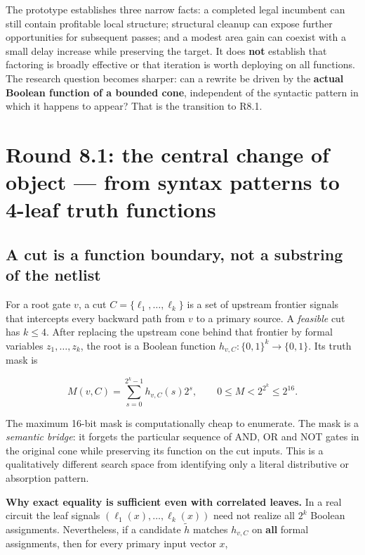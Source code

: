 The prototype establishes three narrow facts: a completed legal incumbent can still contain profitable local structure; structural cleanup can expose further opportunities for subsequent passes; and a modest area gain can coexist with a small delay increase while preserving the target. It does \textbf{not} establish that factoring is broadly effective or that iteration is worth deploying on all functions. The research question becomes sharper: can a rewrite be driven by the \textbf{actual Boolean function of a bounded cone}, independent of the syntactic pattern in which it happens to appear? That is the transition to R8.1.

\section{Round 8.1: the central change of object --- from syntax patterns to 4-leaf truth functions}\label{round-8.1-the-central-change-of-object-from-syntax-patterns-to-4-leaf-truth-functions}

\subsection{A cut is a function boundary, not a substring of the netlist}\label{a-cut-is-a-function-boundary-not-a-substring-of-the-netlist}

For a root gate \(v\), a cut \(C=\{\ell_1,\ldots,\ell_k\}\) is a set of upstream frontier signals that intercepts every backward path from \(v\) to a primary source. A \emph{feasible} cut has \(k\le4\). After replacing the upstream cone behind that frontier by formal variables \(z_1,\ldots,z_k\), the root is a Boolean function \(h_{v,C}:\{0,1\}^k\rightarrow\{0,1\}\). Its truth mask is

\[
M(v,C)=\sum_{s=0}^{2^k-1} h_{v,C}(s)2^s,
\qquad 0\le M<2^{2^k}\le2^{16}.
\]

The maximum 16-bit mask is computationally cheap to enumerate. The mask is a \emph{semantic bridge}: it forgets the particular sequence of AND, OR and NOT gates in the original cone while preserving its function on the cut inputs. This is a qualitatively different search space from identifying only a literal distributive or absorption pattern.

\textbf{Why exact equality is sufficient even with correlated leaves.} In a real circuit the leaf signals \((\ell_1(x),\ldots,\ell_k(x))\) need not realize all \(2^k\) Boolean assignments. Nevertheless, if a candidate \(\tilde h\) matches \(h_{v,C}\) on \textbf{all} formal assignments, then for every primary input vector \(x\),

